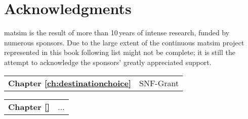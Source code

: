 \chapter*{Acknowledgments}
\gls{matsim} is the result of more than 10\,years of intense research, funded by numerous sponsors. Due to the large extent of the continuous \gls{matsim} project represented in this book following list might not be complete; it is still the attempt to acknowledge the sponsors' greatly appreciated support. 

\begin{tabular}[width=0.48\textwidth]{@{}l l}
\textbf{Chapter \ref{ch:destinationchoice}} & SNF-Grant  \\
\end{tabular}


\begin{tabular}[width=0.48\textwidth]{@{}l l}
\textbf{Chapter \ref{}} & ... \\
\end{tabular}

